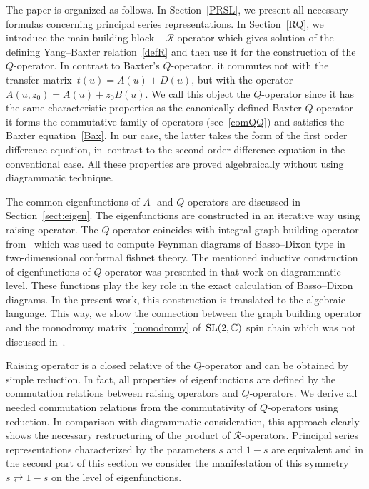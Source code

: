 \documentclass[10pt,a4paper]{amsart}
\numberwithin{equation}{section}
\begin{document}
The paper is organized as follows.
In Section~\ref{PRSL}, we present all necessary formulas concerning
principal series representations.
In Section~\ref{RQ}, we introduce the main building block --
$\mathcal{R}$-operator which gives solution of the defining
Yang--Baxter relation~\eqref{defR} and then use it for the
construction of the $Q$-operator.
In contrast to Baxter's $Q$-operator, it commutes not with the transfer matrix~$t(u)=A(u)+D(u)$, but with the operator $A(u,z_0)=A(u)+z_0 B(u)$.
We call this object the $Q$-operator since it has the same characteristic properties as the canonically defined Baxter $Q$-operator -- it forms the commutative family of operators (see~\eqref{comQQ}) and satisfies the Baxter equation~\eqref{Bax}.
In our case, the latter takes the form of the first order difference equation, in~contrast to the second order difference equation in the conventional case.
All these properties are proved algebraically without
using diagrammatic technique.

The common eigenfunctions of $A$- and $Q$-operators are discussed
in Section~\ref{sect:eigen}.
The eigenfunctions are constructed in an iterative way using raising
operator.
The $Q$-operator coincides with integral graph building operator from~\cite{DKO} which was used to compute Feynman diagrams of Basso--Dixon type in two-dimensional conformal fishnet theory.
The mentioned inductive construction of eigenfunctions of $Q$-operator was presented in that work on diagrammatic level. These functions play the key role in the exact calculation of Basso--Dixon diagrams.
In the present work, this construction is translated to the algebraic language.
This way, we show the connection between the graph building operator and the monodromy matrix~\eqref{monodromy} of~${\rm SL}(2,\mathbb{C})$ spin chain which was not discussed in~\cite{DKO}.

Raising operator is a closed relative of the $Q$-operator and
can be obtained by simple reduction.
In fact, all properties of eigenfunctions are defined by the commutation
relations between raising operators and $Q$-operators.
We derive all needed commutation relations from the commutativity
of $Q$-operators using reduction.
In comparison with diagrammatic consideration, this approach
clearly shows the necessary restructuring of the product of
$\mathcal{R}$-operators.
Principal series representations characterized by the
parameters $s$ and $1-s$ are equivalent and in the second part of this section
we consider the manifestation of this symmetry $s \rightleftarrows 1-s$ on the
level of eigenfunctions.
\end{document}

